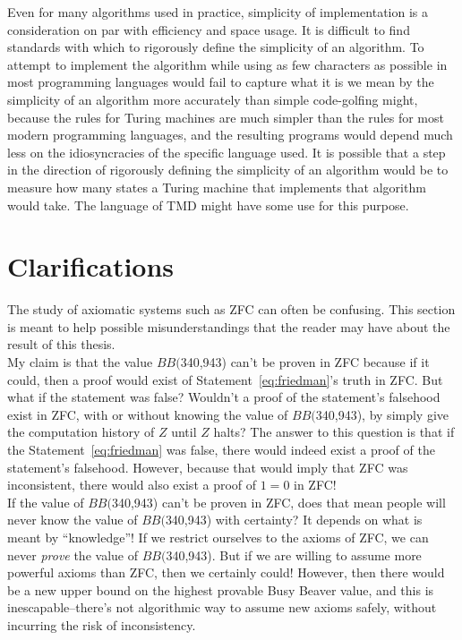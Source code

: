 \documentclass[11pt]{report}
\newcommand{\bbstatenum}{$BB($340,943) }
\newcommand{\bbstatenumcomma}{$BB($340,943), }
\newcommand{\bbstatenumperiod}{$BB($340,943). }
\begin{document}
Even for many algorithms used in practice, simplicity of implementation is a consideration on par with efficiency and space usage. It is difficult to find standards with which to rigorously define the simplicity of an algorithm. To attempt to implement the algorithm while using as few characters as possible in most programming languages would fail to capture what it is we mean by the simplicity of an algorithm more accurately than simple code-golfing might, because the rules for Turing machines are much simpler than the rules for most modern programming languages, and the resulting programs would depend much less on the idiosyncracies of the specific language used. It is possible that a step in the direction of rigorously defining the simplicity of an algorithm would be to measure how many states a Turing machine that implements that algorithm would take. The language of TMD might have some use for this purpose.

\section{Clarifications} \label{sec:faq}

The study of axiomatic systems such as ZFC can often be confusing. This section is meant to help possible misunderstandings that the reader may have about the result of this thesis. \\

My claim is that the value \bbstatenum can't be proven in ZFC because if it could, then a proof would exist of Statement~\ref{eq:friedman}'s truth in ZFC. But what if the statement was false? Wouldn't a proof of the statement's falsehood exist in ZFC, with or without knowing the value of \bbstatenumcomma by simply give the computation history of $Z$ until $Z$ halts? The answer to this question is that if the Statement~\ref{eq:friedman} was false, there would indeed exist a proof of the statement's falsehood. However, because that would imply that ZFC was inconsistent, there would also exist a proof of $1=0$ in ZFC! \\

If the value of \bbstatenum can't be proven in ZFC, does that mean people will never know the value of \bbstatenum with certainty? It depends on what is meant by ``knowledge''! If we restrict ourselves to the axioms of ZFC, we can never \emph{prove} the value of \bbstatenumperiod But if we are willing to assume more powerful axioms than ZFC, then we certainly could! However, then there would be a new upper bound on the highest provable Busy Beaver value, and this is inescapable--there's not algorithmic way to assume new axioms safely, without incurring the risk of inconsistency.  \\
\end{document}
